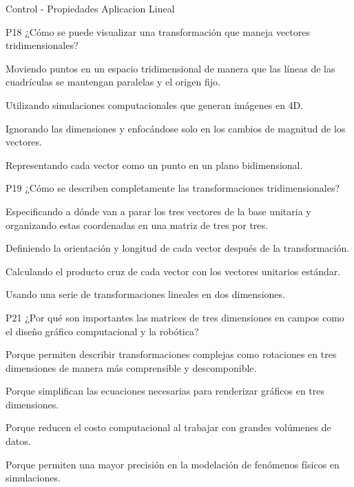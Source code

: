 \documentclass[a4,11pt]{aleph-notas}
\begin{document}
\begin{quiz}{Control - Propiedades Aplicacion Lineal}
\begin{multi}[]%
    {P18}     
    ¿Cómo se puede visualizar una transformación que maneja vectores tridimensionales?     
    \item* Moviendo puntos en un espacio tridimensional de manera que las líneas de las cuadrículas se mantengan paralelas y el origen fijo.     
    \item Utilizando simulaciones computacionales que generan imágenes en 4D.     
    \item Ignorando las dimensiones y enfocándose solo en los cambios de magnitud de los vectores.     
    \item Representando cada vector como un punto en un plano bidimensional.
\end{multi}

\begin{multi}[]%
    {P19}     
    ¿Cómo se describen completamente las transformaciones tridimensionales?     
    \item* Especificando a dónde van a parar los tres vectores de la base unitaria y organizando estas coordenadas en una matriz de tres por tres.     
    \item Definiendo la orientación y longitud de cada vector después de la transformación.     
    \item Calculando el producto cruz de cada vector con los vectores unitarios estándar.     
    \item Usando una serie de transformaciones lineales en dos dimensiones.
\end{multi}

\begin{multi}[]%
    {P21}     
    ¿Por qué son importantes las matrices de tres dimensiones en campos como el diseño gráfico computacional y la robótica?     
    \item* Porque permiten describir transformaciones complejas como rotaciones en tres dimensiones de manera más comprensible y descomponible.     
    \item Porque simplifican las ecuaciones necesarias para renderizar gráficos en tres dimensiones.     
    \item Porque reducen el costo computacional al trabajar con grandes volúmenes de datos.     
    \item Porque permiten una mayor precisión en la modelación de fenómenos físicos en simulaciones.
\end{multi}


\end{quiz}
\end{document}
